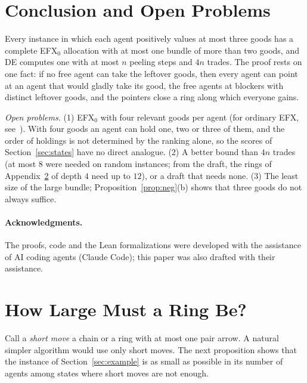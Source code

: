 \documentclass[runningheads,11pt]{llncs}
\newcommand{\efxz}{\texorpdfstring{\mbox{EFX$_0$}}{EFX0}}
\newcommand{\DE}{\textup{DE}}
\begin{document}
\section{Conclusion and Open Problems}\label{sec:concl}

Every instance in which each agent positively values at most three goods has a complete \efxz{} allocation with at most one bundle of more than two goods, and \DE{} computes one with at most $n$ peeling steps and $4n$ trades. The proof rests on one fact: if no free agent can take the leftover goods, then every agent can point at an agent that would gladly take its good, the free agents at blockers with distinct leftover goods, and the pointers close a ring along which everyone gains.

\emph{Open problems.} (1) \efxz{} with four relevant goods per agent (for ordinary EFX, see~\cite{ViswanathanM24}). With four goods an agent can hold one, two or three of them, and the order of holdings is not determined by the ranking alone, so the scores of Section~\ref{sec:states} have no direct analogue. (2) A better bound than $4n$ trades (at most $8$ were needed on random instances; from the draft, the rings of Appendix~\ref{app:size} of depth $4$ need up to $12$), or a draft that needs none. (3) The least size of the large bundle; Proposition~\ref{prop:neg}(b) shows that three goods do not always suffice.

\paragraph{Acknowledgments.} The proofs, code and the Lean formalizations were developed with the assistance of AI coding agents (Claude Code); this paper was also drafted with their assistance.




\appendix

\section{How Large Must a Ring Be?}\label{app:size}

Call a \emph{short move} a chain or a ring with at most one pair arrow. A natural simpler algorithm would use only short moves. The next proposition shows that the instance of Section~\ref{sec:example} is as small as possible in its number of agents among states where short moves are not enough.
\end{document}
